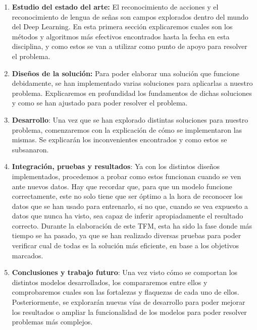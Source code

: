 \documentclass{article} %
\begin{document}
\begin{enumerate}
\item  \textbf{Estudio del estado del arte:} El reconocimiento de acciones y el reconocimiento de lengua de se\~{n}as son campos explorados dentro del mundo del Deep Learning. En esta primera secci\'{o}n explicaremos cuales son los m\'{e}todos y algoritmos m\'{a}s efectivos encontrados hasta la fecha en esta disciplina, y como estos se van a utilizar como punto de apoyo para resolver el problema.

\item  \textbf{Dise\~{n}os de la soluci\'{o}n:} Para poder elaborar una soluci\'{o}n que funcione debidamente, se han implementado varias soluciones para aplicarlas a nuestro problema. Explicaremos en profundidad los fundamentos de dichas soluciones y como se han ajustado para poder resolver el problema.

\item  \textbf{Desarrollo}: Una vez que se han explorado distintas soluciones para nuestro problema, comenzaremos con la explicaci\'{o}n de c\'{o}mo se implementaron las mismas. Se explicar\'{a}n los inconvenientes encontrados y como estos se subsanaron. 

\item  \textbf{Integraci\'{o}n, pruebas y resultados}: Ya con los distintos dise\~{n}os implementados, procedemos a probar como estos funcionan cuando se ven ante nuevos datos. Hay que recordar que, para que un modelo funcione correctamente, este no solo tiene que ser \'{o}ptimo a la hora de reconocer los datos que se han usado para entrenarlo, si no que, cuando se vea expuesto a datos que nunca ha visto, sea capaz de inferir apropiadamente el resultado correcto. Durante la elaboraci\'{o}n de este TFM, esta ha sido la fase donde m\'{a}s tiempo se ha pasado, ya que se han realizado diversas pruebas para poder verificar cual de todas es la soluci\'{o}n m\'{a}s eficiente, en base a los objetivos marcados.

\item  \textbf{Conclusiones y trabajo futuro}: Una vez visto c\'{o}mo se comportan los distintos modelos desarrollados, los compararemos entre ellos y comprobaremos cuales son las fortalezas y flaquezas de cada uno de ellos. Posteriormente, se explorar\'{a}n nuevas v\'{i}as de desarrollo para poder mejorar los resultados o ampliar la funcionalidad de los modelos para poder resolver problemas m\'{a}s complejos.
\end{enumerate}
\end{document}
